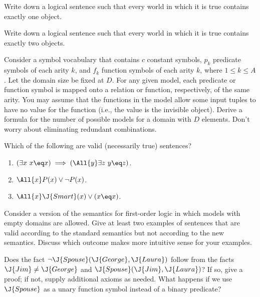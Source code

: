 \begin{uexercise}
Write down a logical sentence such that every world in which it is
true contains exactly one object.
\end{uexercise} 

\begin{iexercise}
Write down a logical sentence such that every world in which it is
true contains exactly two objects.
\end{iexercise} 

\begin{exercise}
Consider a symbol vocabulary that contains \(c\) constant symbols, \(p_k\)
predicate symbols of each arity \(k\), and \(f_k\) function symbols of
each arity \(k\), where \(1\leq k\leq A\).  Let the domain size be fixed
at \(D\).  For any given model, each
predicate or function symbol is mapped onto a relation or function,
respectively, of the same arity.  You may assume that the functions in
the model allow some input tuples to have no value for the function
(i.e., the value is the invisible object).  Derive a formula for the
number of possible models for a domain with
\(D\) elements. Don't worry about eliminating redundant combinations.
\end{exercise} 

\begin{exercise}
Which of the following are valid (necessarily true) sentences?
\begin{enumerate}
  \item \((\exists x\ x\eq x) \implies (\All{y} \exists z\ y\eq z)\).
  \item \(\All{x} P(x) \lor \lnot P(x)\).
  \item \(\All{x} \J{Smart}(x) \lor (x\eq x)\).
\end{enumerate}
\end{exercise} 

\begin{exercise}
Consider a version of the semantics for first-order logic in which
models with empty domains are allowed. Give at least two examples of
sentences that are valid according to the standard semantics but not
according to the new semantics.  Discuss which outcome makes more
intuitive sense for your examples.
\end{exercise} 

\begin{exercise}%
Does the fact \(\lnot \J{Spouse}(\J{George},\J{Laura})\)
follow from the facts \(\J{Jim}\neq \J{George}\) and 
\noindent \(\J{Spouse}(\J{Jim},\J{Laura})\)? If so, give a proof; if not, supply additional axioms as needed. What happens if we use \(\J{Spouse}\) as a unary function symbol instead of a binary predicate?
\end{exercise} 

